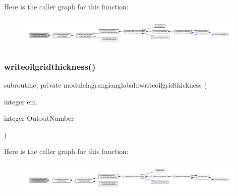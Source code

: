 Here is the caller graph for this function\+:\nopagebreak
\begin{figure}[H]
\begin{center}
\leavevmode
\includegraphics[width=350pt]{namespacemodulelagrangianglobal_ac2eff795bcd9d725896afa0d50c89794_icgraph}
\end{center}
\end{figure}
\mbox{\label{namespacemodulelagrangianglobal_a388d34c449f0175617349ab4081a3dd4}} 
\subsubsection{\texorpdfstring{writeoilgridthickness()}{writeoilgridthickness()}}
{\footnotesize\ttfamily subroutine, private modulelagrangianglobal\+::writeoilgridthickness (\begin{DoxyParamCaption}\item[{integer}]{em,  }\item[{integer}]{Output\+Number }\end{DoxyParamCaption})\hspace{0.3cm}{\ttfamily [private]}}

Here is the caller graph for this function\+:\nopagebreak
\begin{figure}[H]
\begin{center}
\leavevmode
\includegraphics[width=350pt]{namespacemodulelagrangianglobal_a388d34c449f0175617349ab4081a3dd4_icgraph}
\end{center}
\end{figure}
\mbox{\label{namespacemodulelagrangianglobal_ab6a14231f1191c9852f886b90950db80}} 
